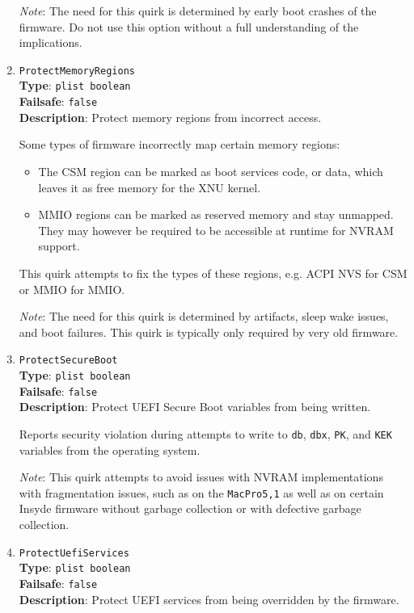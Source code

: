 \documentclass[]{article}
\providecommand{\tightlist}{%
  \setlength{\itemsep}{0pt}\setlength{\parskip}{0pt}}
\begin{document}
\begin{enumerate}
  \emph{Note}: The need for this quirk is determined by early boot crashes of the
  firmware. Do not use this option without a full understanding of the implications.

\item
  \texttt{ProtectMemoryRegions}\\
  \textbf{Type}: \texttt{plist\ boolean}\\
  \textbf{Failsafe}: \texttt{false}\\
  \textbf{Description}: Protect memory regions from incorrect access.

  Some types of firmware incorrectly map certain memory regions:

  \begin{itemize}
    \tightlist
    \item The CSM region can be marked as boot services code, or data, which
      leaves it as free memory for the XNU kernel.
    \item MMIO regions can be marked as reserved memory and stay unmapped.
      They may however be required to be accessible at runtime for NVRAM support.
  \end{itemize}

  This quirk attempts to fix the types of these regions, e.g. ACPI NVS for
  CSM or MMIO for MMIO.

  \emph{Note}: The need for this quirk is determined by artifacts, sleep
  wake issues, and boot failures. This quirk is typically only required by
  very old firmware.

\item
  \texttt{ProtectSecureBoot}\\
  \textbf{Type}: \texttt{plist\ boolean}\\
  \textbf{Failsafe}: \texttt{false}\\
  \textbf{Description}: Protect UEFI Secure Boot variables from being written.

  Reports security violation during attempts to write to \texttt{db}, \texttt{dbx},
  \texttt{PK}, and \texttt{KEK} variables from the operating system.

  \emph{Note}: This quirk attempts to avoid issues with NVRAM implementations with
  fragmentation issues, such as on the \texttt{MacPro5,1} as well as on certain
  Insyde firmware without garbage collection or with defective garbage collection.

\item
  \texttt{ProtectUefiServices}\\
  \textbf{Type}: \texttt{plist\ boolean}\\
  \textbf{Failsafe}: \texttt{false}\\
  \textbf{Description}: Protect UEFI services from being overridden by the firmware.


\end{enumerate}
\end{document}
